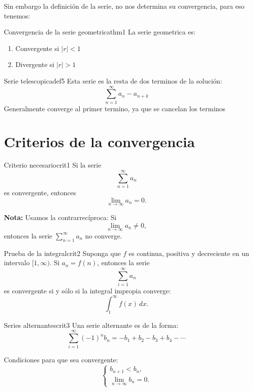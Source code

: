\documentclass[12pt,a4paper]{article}
\begin{document}
Sin embargo la definición de la serie, no nos determina su convergencia, para eso tenemos:

\begin{teorema}{Convergencia de la serie geometrica}{thm1}
    La serie geometrica es: 
    \begin{enumerate}
        \item Convergente si $|r| < 1$
        \item Divergente si $|r| > 1$
    \end{enumerate}
\end{teorema}

\begin{definicion}{Serie telescopica}{def5}
    Esta serie es la resta de dos terminos de la solución:
    \[ 
        \sum_{n = 1}^{\infty} a_n - a_{n + k} 
    \]
    Generalmente converge al primer termino, ya que se cancelan los terminos
\end{definicion} 

\section{Criterios de la convergencia}
\begin{teorema}{Criterio necesario}{crit1}
    Si la serie 
    \[
        \sum_{n=1}^{\infty} a_n
    \]
    es convergente, entonces 
    \[
        \lim_{n \to \infty} a_n = 0.
    \]

    \textbf{Nota:} Usamos la contrarrecíproca:  
    Si 
    \[
        \lim_{n \to \infty} a_n \neq 0,
    \]
    entonces la serie 
    \(\sum_{n=1}^{\infty} a_n\) no converge.
\end{teorema}

\begin{teorema}{Prueba de la integral}{crit2}
    Suponga que $f$ es continua, positiva y decreciente en un intervalo $[1, \infty)$.  
    Si $a_n = f(n)$, entonces la serie
    \[
        \sum_{i=1}^{\infty} a_n
    \]
    es convergente si y sólo si la integral impropia converge:
    \[
        \int_{1}^{\infty} f(x)\,dx.
    \]
\end{teorema}

\begin{teorema}{Series alternantes}{crit3}
    Una serie alternante es de la forma:
    \[
        \sum_{i=1}^{\infty} (-1)^n b_n = -b_1 + b_2 - b_3 + b_4 - \cdots
    \]

    Condiciones para que sea convergente:
    \[
        \begin{cases}
            b_{n+1} < b_n, \\
            \lim_{n \to \infty} b_n = 0.
        \end{cases}
    \]
\end{teorema}
\end{document}
